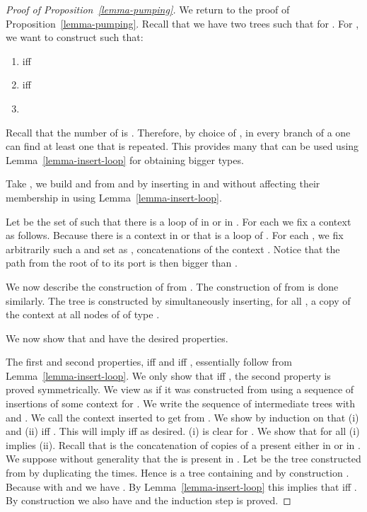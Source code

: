\begin{proof}[Proof of Proposition~\ref{lemma-pumping}]
\medskip

We return to the proof of Proposition~\ref{lemma-pumping}. Recall that
we have two trees  such that  for . For , we want to construct  such that:
 
\begin{enumerate}[(1)]
\item  iff 
\item  iff 
\item {}
\end{enumerate}



Recall that the number of \ktypes is . Therefore, by choice of , in
every branch of a \type{\kappa} one can find at least one \ktype that is repeated.
This provides many \kloops that can be used using Lemma~\ref{lemma-insert-loop}
for obtaining bigger types.

Take , we build  and  from  and  by inserting \kloops
in  and  without affecting their membership in  using
Lemma~\ref{lemma-insert-loop}.

  Let  be the set of \ktypes  such that
  there is a loop of \ktype  in  or in . For each  we
  fix a context  as follows. Because  there is a context
   in  or  that is a loop of \ktype . For each , we
  fix arbitrarily such a  and set  as ,  concatenations of the context . Notice that the path
  from the root of  to its port is then bigger than .

  We now describe the construction of  from . The construction of 
  from  is done similarly. The tree  is constructed by simultaneously inserting,
  for all , a copy of the context  at all nodes of  of type .

  We now show that  and  have the desired properties. 
  
  The first and second properties,  iff  and  iff
  , essentially follow from Lemma~\ref{lemma-insert-loop}. We only
  show that  iff , the second property is proved
  symmetrically. We view  as if it was constructed from  using a sequence
  of insertions of some context  for . We write
   the sequence of intermediate trees with  and . We
  call  the context inserted to get  from .  We show by
  induction on  that (i)  and (ii)  iff
  . This will imply  iff  as desired.  (i) is
  clear for . We show that for all  (i) implies (ii). Recall that 
  is the concatenation of  copies of a \kloop present either in  or in
  .  We suppose without generality that the \kloop is present in .  Let
   be the tree constructed from  by duplicating the \kloop 
  times. Hence  is a tree containing  and by construction
  . Because  with  and  we have . By
  Lemma~\ref{lemma-insert-loop} this implies that  iff . By construction we also have  and the
  induction step is proved.



\end{proof}
